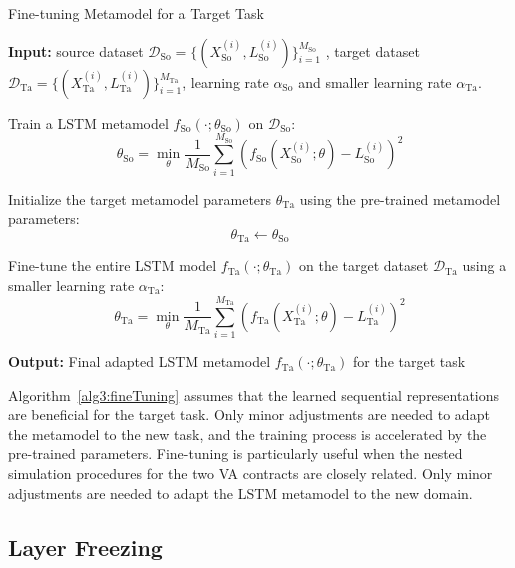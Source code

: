 \begin{algorithm}[ht!]
\caption{Fine-tuning Metamodel for a Target Task}
\begin{algorithmic}[1] \label{alg3:fineTuning}
    \STATE \textbf{Input:} source dataset $\mathcal{D}_{\text{So}} = \{(X_{\text{So}}^{(i)}, L_{\text{So}}^{(i)})\}_{i=1}^{M_{\text{So}}}$ , target dataset $\mathcal{D}_{\text{Ta}} = \{(X_{\text{Ta}}^{(i)}, L_{\text{Ta}}^{(i)})\}_{i=1}^{M_{\text{Ta}}}$, learning rate $\alpha_{\text{So}}$ and smaller learning rate $\alpha_{\text{Ta}}$.
    
    \STATE Train a LSTM metamodel $f_{\text{So}}(\cdot; \theta_{\text{So}})$ on $\mathcal{D}_{\text{So}}$:
    \begin{equation}
        \theta_{\text{So}} = \min_{\theta} \frac{1}{M_{\text{So}}} \sum_{i=1}^{M_{\text{So}}} \left( f_{\text{So}}(X_{\text{So}}^{(i)}; \theta) - L_{\text{So}}^{(i)} \right)^2
    \end{equation}

    \STATE Initialize the target metamodel parameters $\theta_{\text{Ta}}$ using the pre-trained metamodel parameters:
    \[
    \theta_{\text{Ta}} \gets \theta_{\text{So}}
    \]
    
    \STATE Fine-tune the entire LSTM model $f_{\text{Ta}}(\cdot; \theta_{\text{Ta}})$ on the target dataset $\mathcal{D}_{\text{Ta}}$ using a smaller learning rate $\alpha_{\text{Ta}}$:
    \begin{equation}
        \theta_{\text{Ta}} = \min_{\theta} \frac{1}{M_{\text{Ta}}} \sum_{i=1}^{M_{\text{Ta}}} \left( f_{\text{Ta}}(X_{\text{Ta}}^{(i)}; \theta) - L_{\text{Ta}}^{(i)} \right)^2
    \end{equation}
    
    \STATE \textbf{Output:} Final adapted LSTM metamodel $f_{\text{Ta}}(\cdot; \theta_{\text{Ta}})$ for the target task
\end{algorithmic}
\end{algorithm}

Algorithm~\ref{alg3:fineTuning} assumes that the learned sequential representations are beneficial for the target task.
Only minor adjustments are needed to adapt the metamodel to the new task, and the training process is accelerated by the pre-trained parameters.
Fine-tuning is particularly useful when the nested simulation procedures for the two VA contracts are closely related.
Only minor adjustments are needed to adapt the LSTM metamodel to the new domain.

\subsection{Layer Freezing}

